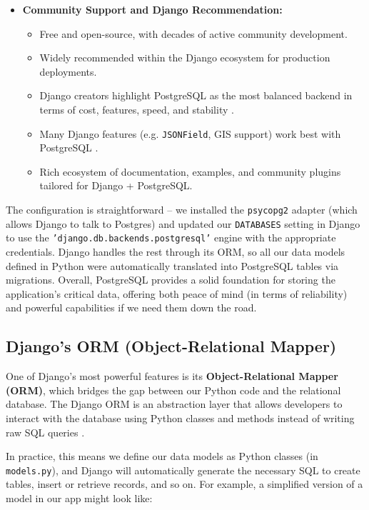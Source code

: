 \begin{itemize}
	\item \textbf{Community Support and Django Recommendation:} 
	\begin{itemize}
		\item Free and open-source, with decades of active community development. 
		\item Widely recommended within the Django ecosystem for production deployments. 
		\item Django creators highlight PostgreSQL as the most balanced backend in terms of cost, features, speed, and stability \parencite{DjangoDatabases,DjangoPostgresFields}. 
		\item Many Django features (e.g. \texttt{JSONField}, GIS support) work best with PostgreSQL \parencite{DjangoPostgresFields}. 
		\item Rich ecosystem of documentation, examples, and community plugins tailored for Django + PostgreSQL. 
	\end{itemize}
\end{itemize} 

The configuration is straightforward – we installed the \texttt{psycopg2} adapter (which allows Django to talk to Postgres) and updated our \texttt{DATABASES} setting in Django to use the \texttt{'django.db.backends.postgresql'} engine with the appropriate credentials. Django handles the rest through its ORM, so all our data models defined in Python were automatically translated into PostgreSQL tables via migrations. Overall, PostgreSQL provides a solid foundation for storing the application’s critical data, offering both peace of mind (in terms of reliability) and powerful capabilities if we need them down the road.

\subsection{Django’s ORM (Object-Relational Mapper)} 

One of Django’s most powerful features is its 
\textbf{Object-Relational Mapper (ORM)}, which bridges the gap between our 
Python code and the relational database. The Django ORM is an abstraction 
layer that allows developers to interact with the database using Python 
classes and methods instead of writing raw SQL queries \parencite{DjangoORMQueries}. 

In practice, this means we define our data models as Python classes (in 
\texttt{models.py}), and Django will automatically generate the necessary SQL 
to create tables, insert or retrieve records, and so on. For example, a 
simplified version of a model in our app might look like: 


